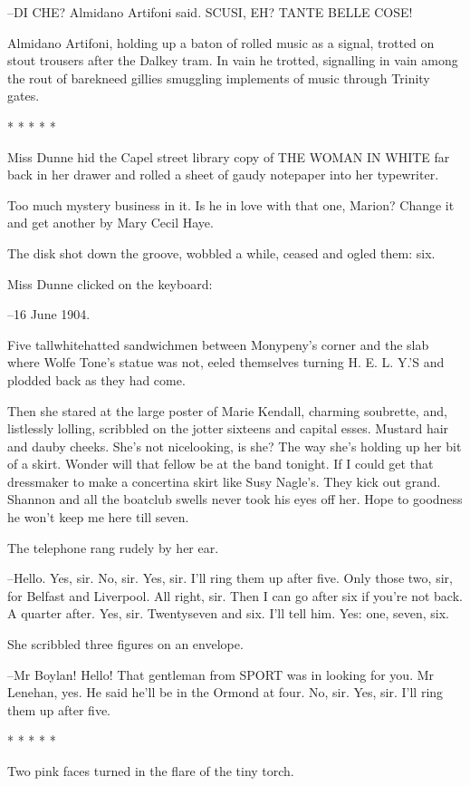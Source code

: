 --DI CHE? Almidano Artifoni said. SCUSI, EH? TANTE BELLE COSE!

Almidano Artifoni, holding up a baton of rolled music as a signal,
trotted on stout trousers after the Dalkey tram. In vain he trotted,
signalling in vain among the rout of barekneed gillies smuggling
implements of music through Trinity gates.


    * * * * *


Miss Dunne hid the Capel street library copy of THE WOMAN IN WHITE
far back in her drawer and rolled a sheet of gaudy notepaper into her
typewriter.

Too much mystery business in it. Is he in love with that one, Marion?
Change it and get another by Mary Cecil Haye.

The disk shot down the groove, wobbled a while, ceased and ogled
them: six.

Miss Dunne clicked on the keyboard:

--16 June 1904.

Five tallwhitehatted sandwichmen between Monypeny's corner and
the slab where Wolfe Tone's statue was not, eeled themselves turning
H. E. L. Y.'S and plodded back as they had come.


Then she stared at the large poster of Marie Kendall, charming soubrette,
and, listlessly lolling, scribbled on the jotter sixteens and capital
esses. Mustard hair and dauby cheeks. She's not nicelooking, is she? The
way she's holding up her bit of a skirt. Wonder will that fellow be at the
band tonight. If I could get that dressmaker to make a concertina skirt
like Susy Nagle's. They kick out grand. Shannon and all the boatclub
swells never took his eyes off her. Hope to goodness he won't keep me here
till seven.

The telephone rang rudely by her ear.

--Hello. Yes, sir. No, sir. Yes, sir. I'll ring them up after five. Only
those two, sir, for Belfast and Liverpool. All right, sir. Then I can go
after six if you're not back. A quarter after. Yes, sir. Twentyseven and
six. I'll tell him. Yes: one, seven, six.

She scribbled three figures on an envelope.

--Mr Boylan! Hello! That gentleman from SPORT was in looking for you.
Mr Lenehan, yes. He said he'll be in the Ormond at four. No, sir. Yes,
sir. I'll ring them up after five.


    * * * * *


Two pink faces turned in the flare of the tiny torch.

